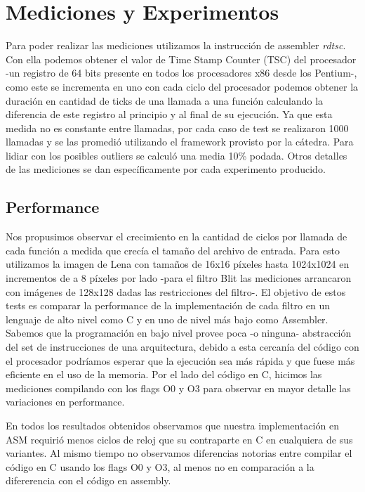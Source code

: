 \section{Mediciones y Experimentos}

Para poder realizar las mediciones utilizamos la instrucción de assembler \textit{rdtsc}. Con ella podemos obtener el valor de Time Stamp Counter (TSC) del procesador -un registro de 64 bits presente en todos los procesadores x86 desde los Pentium-, como este se incrementa en uno con cada ciclo del procesador podemos obtener la duración en cantidad de ticks de una llamada a una función calculando la diferencia de este registro al principio y al final de su ejecución. Ya que esta medida no es constante entre llamadas, por cada caso de test se realizaron 1000 llamadas y se las promedió utilizando el framework provisto por la cátedra. Para lidiar con los posibles outliers se calculó una media 10\% podada. Otros detalles de las mediciones se dan específicamente por cada experimento producido.

\subsection{Performance}

Nos propusimos observar el crecimiento en la cantidad de ciclos por llamada de cada función a medida que crecía el tamaño del archivo de entrada. Para esto utilizamos la imagen de Lena con tamaños de 16x16 píxeles hasta 1024x1024 en incrementos de a 8 píxeles por lado -para el filtro Blit las mediciones arrancaron con imágenes de 128x128 dadas las restricciones del filtro-. El objetivo de estos tests es comparar la performance de la implementación de cada filtro en un lenguaje de alto nivel como C y en uno de nivel más bajo como Assembler. Sabemos que la programación en bajo nivel provee poca -o ninguna- abstracción del set de instrucciones de una arquitectura, debido a esta cercanía del código con el procesador podríamos esperar que la ejecución sea más rápida y que fuese más eficiente en el uso de la memoria. Por el lado del código en C, hicimos las mediciones compilando con los flags O0 y O3 para observar en mayor detalle las variaciones en performance.

En todos los resultados obtenidos observamos que nuestra implementación en ASM requirió menos ciclos de reloj que su contraparte en C en cualquiera de sus variantes. Al mismo tiempo no observamos diferencias notorias entre compilar el código en C usando los flags O0 y O3, al menos no en comparación a la difererencia con el código en assembly. 

